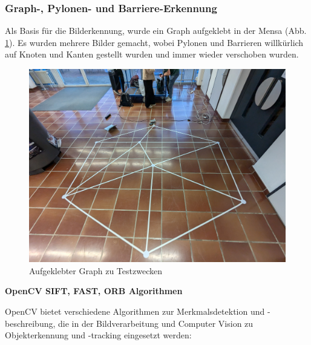 \subsubsection{Graph-, Pylonen- und Barriere-Erkennung}






Als Basis für die Bilderkennung, wurde ein Graph aufgeklebt in der Mensa (Abb. \ref{fig:test-graph}). Es wurden mehrere Bilder gemacht, wobei Pylonen und Barrieren willkürlich auf Knoten und Kanten gestellt wurden und immer wieder verschoben wurden.

\begin{figure}[H]
    \centering
    \includegraphics[width=1\linewidth]{assets/informatik-prototyp/opencv/test_graph.jpg}
    \caption{Aufgeklebter Graph zu Testzwecken}
    \label{fig:test-graph}
\end{figure}

\textbf{OpenCV SIFT, FAST, ORB Algorithmen}

OpenCV bietet verschiedene Algorithmen zur Merkmalsdetektion und -beschreibung, die in der Bildverarbeitung und Computer Vision zu Objekterkennung und -tracking eingesetzt werden:

